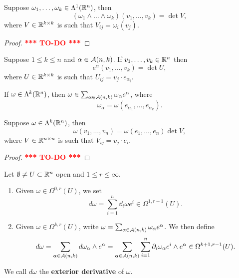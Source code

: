 \documentclass[a4paper]{article}
\newcommand{\TODO}{\textcolor{red}{\textbf{*** TO-DO ***}}}
\begin{document}
\begin{prop}
  Suppose $\omega_1, \dots, \omega_k \in \Lambda^1 (\mathbb{R}^n)$, then
  \[
    (\omega_1 \wedge \dots \wedge \omega_k)
    (v_1, \dots, v_k) = \det V,
  \]
  where $V \in \mathbb{R}^{k \times k}$ is such that $V_{ij} = \omega_i (v_j)$.
\end{prop}

\begin{proof}
  \TODO
\end{proof}

\begin{cor}
  Suppose $1 \leq k \leq n$ and $\alpha \in \mathcal{A}(n, k)$.
  If $v_1, \dots, v_k \in \mathbb{R}^n$ then
  \[
    e^\alpha (v_1, \dots, v_k) = \det U,
  \]
  where $U \in \mathbb{R}^{k \times k}$ is such that $U_{ij} = v_j \cdot
  e_{\alpha_i}$.
\end{cor}

\begin{cor}
  If $\omega \in \Lambda^k(\mathbb{R}^n)$, then $\omega \in \sum_{\alpha
      \in \mathcal{A}(n, k)} \omega_\alpha e^\alpha$, where
  \[
    \omega_\alpha = \omega(e_{\alpha_1}, \dots, e_{\alpha_k}).
  \]
\end{cor}

\begin{prop}
  Suppose $\omega \in \Lambda^k(\mathbb{R}^n)$, then
  \[
    \omega(v_1, \dots, v_n) = \omega(e_1, \dots, e_n) \det V,
  \]
  where $V \in \mathbb{R}^{n \times n}$ is such that $V_{ij} = v_j \cdot e_i$.
\end{prop}

\begin{proof}
  \TODO
\end{proof}

\begin{defi}
  Let $\emptyset \neq U \subset \mathbb{R}^n$ open and $1 \leq r \leq
    \infty$.
  \begin{enumerate}
    \item Given $\omega \in \Omega^{0, r}(U)$, we set
          \[
            d \omega = \sum_{i=1}^n \dd_i \omega e^i \in \Omega^{1, r-1}
            (U).
          \]
    \item Given $\omega \in \Omega^{k, r}(U)$, write $\omega =
          \sum_{\alpha \in \mathcal{A}(n, k)} \omega_\alpha e^\alpha$. We then
          define
          \[
            d \omega
            = \sum_{\alpha \in \mathcal{A}(n, k)} d \omega_\alpha \wedge
            e^\alpha
            = \sum_{\alpha \in \mathcal{A}(n, k)} \sum_{i=1}^n
            \partial_i \omega_\alpha e^i \wedge e^\alpha
            \in \Omega^{k+1, r-1}(U).
          \]
  \end{enumerate}
  We call $d \omega$ the \textbf{exterior derivative} of $\omega$.
\end{defi}
\end{document}
